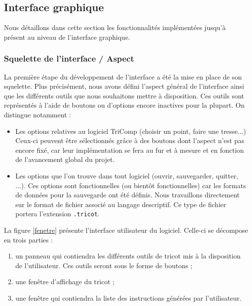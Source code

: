\documentclass{article}
\begin{document}
\subsection{Interface graphique}

Nous détaillons dans cette section les fonctionnalités implémentées jusqu'à présent au niveau de l'interface graphique.

\subsubsection{Squelette de l'interface / Aspect}

La première étape du développement de l'interface a été la mise en place de son squelette. Plus précisément, nous avons défini l'aspect
général de l'interface ainsi que les différents outils que nous souhaitons mettre à disposition. Ces outils sont représentés à l'aide de
boutons ou d'options encore inactives pour la plupart. On distingue notamment :
\begin{itemize}
  \item Les options relatives au logiciel TriComp (choisir un point, faire une tresse...) Ceux-ci peuvent être sélectionnés grâce à des
boutons dont l'aspect n'est pas encore fixé, car leur implémentation se fera au fur et à mesure et en fonction de l'avancement global du
projet.
  \item Les options que l'on trouve dans tout logiciel (ouvrir, sauvegarder, quitter, ...). Ces options sont fonctionnelles (ou bientôt
fonctionnelles) car les formats de données pour la sauvegarde ont été définis. Nous travaillons directement sur le format de fichier
associé au langage descriptif. Ce type de fichier portera l'extension \texttt{.tricot}.
\end{itemize}
La figure \ref{fenetre} présente l'interface utilisateur du logiciel. Celle-ci se décompose en trois parties : 
\begin{enumerate}
   \item un panneau qui contiendra les différents outils de tricot mis à la disposition de l'utilisateur. Ces outils seront sous le forme de boutons ;
   \item une fenêtre d'affichage du tricot ;
   \item une fenêtre qui contiendra la liste des instructions générées par l'utilisateur.
\end{enumerate}
\end{document}
